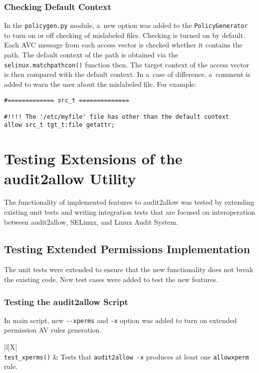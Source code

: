 \subsection{Checking Default Context}
In the \texttt{policygen.py} module, a~new option was added to the
\texttt{PolicyGenerator} to turn on or off checking of mislabeled files.
Checking is turned on by default. Each AVC message from each access vector is
checked whether it contains the path. The default context of the path is
obtained via the \texttt{selinux.matchpathcon()} function then. The target
context of the access vector is then compared with the default context. In
a~case of difference, a~comment is added to warn the user about the mislabeled
file. For example:
\begin{lstlisting}
#============= src_t ==============

#!!!! The '/etc/myfile' file has other than the default context
allow src_t tgt_t:file getattr;
\end{lstlisting}

\chapter{Testing Extensions of the audit2allow Utility}
\label{testing}
The functionality of implemented features to audit2allow was tested by extending
existing unit tests and writing integration tests that are focused on
interoperation between audit2allow, SELinux, and Linux Audit System.

\section{Testing Extended Permissions Implementation}
The unit tests were extended to ensure that the new functionality does not break
the existing code. New test cases were added to test the new features.

\subsection{Testing the audit2allow Script}
In main script, new \texttt{-{}-xperms} and \texttt{-x} option was added to turn
on extended permission AV rules generation.
\tabulinesep=5pt

\begin{longtabu}{|l|X|} \hline \endfirsthead
    \\ \hline
    \texttt{test\_xperms()} & Tests that \texttt{audit2allow -x} produces at
    least one \texttt{allowxperm} rule. \\ \hline
\end{longtabu}

